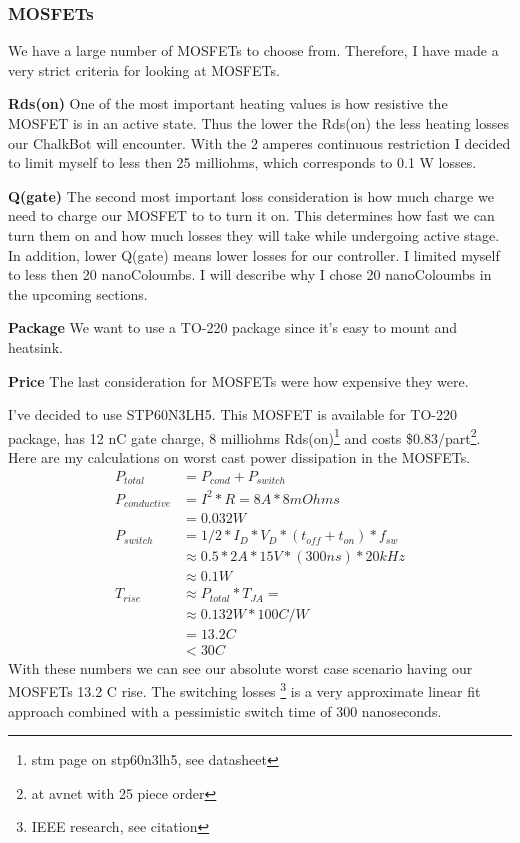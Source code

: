 \documentclass[12pt]{article}
\begin{document}
\subsubsection{MOSFETs}
We have a large number of MOSFETs to choose from. Therefore, I have made a very strict criteria for looking at MOSFETs.
\begin{description}
\item{\bf Rds(on)} One of the most important heating values is how resistive the MOSFET is in an active state. Thus the lower the Rds(on) the less heating losses our ChalkBot will encounter. With the 2 amperes continuous restriction I decided to limit myself to less then 25 milliohms, which corresponds to 0.1 W losses.
\item{\bf Q(gate)} The second most important loss consideration is how much charge we need to charge our MOSFET to to turn it on. This determines how fast we can turn them on and how much losses they will take while undergoing active stage. In addition, lower Q(gate) means lower losses for our controller. I limited myself to less then 20 nanoColoumbs. I will describe why I chose 20 nanoColoumbs in the upcoming sections.
\item{\bf Package} We want to use a TO-220 package since it's easy to mount and heatsink. 
\item{\bf Price} The last consideration for MOSFETs were how expensive they were.
\end{description}
I've decided to use STP60N3LH5. This MOSFET is available for TO-220 package, has 12 nC gate charge, 8 milliohms Rds(on)\footnote{stm page on stp60n3lh5, see datasheet} and costs \$0.83/part\footnote{at avnet with 25 piece order}. Here are my calculations on worst cast power dissipation in the MOSFETs. 
\begin{align}
P_{total} &= P_{cond} + P_{switch} \\
P_{conductive} &= I^{2} * R =  8 A * 8 mOhms 
\\ &= 0.032 W
\\ P_{switch} &= 1/2 * I_{D} * V_{D} * (t_{off} + t_{on}) * f_{sw} 
\\  &\approx 0.5 * 2A * 15 V * (300 ns) * 20 kHz
\\ &\approx 0.1 W
\\T_{rise}&\approx P_{total} * T_{JA} = 
\\ &\approx 0.132 W * 100 C/W 
\\ &=13.2 C
\\ &<30C
\end{align}
With these numbers we can see our absolute worst case scenario having our MOSFETs 13.2 C rise. The switching losses \footnote{IEEE research, see citation} is a very approximate linear fit approach combined with a pessimistic switch time of 300 nanoseconds.
\end{document}
